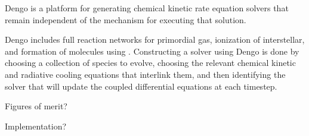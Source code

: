 Dengo is a platform for generating chemical kinetic rate equation solvers that
remain independent of the mechanism for executing that solution.


Dengo includes full reaction networks for primordial gas, ionization of
interstellar, and formation of molecules using .  Constructing a
solver using Dengo is done by choosing a collection of species to evolve,
choosing the relevant chemical kinetic and radiative cooling equations that
interlink them, and then identifying the solver that will update the coupled
differential equations at each timestep.



Figures of merit?

Implementation?
